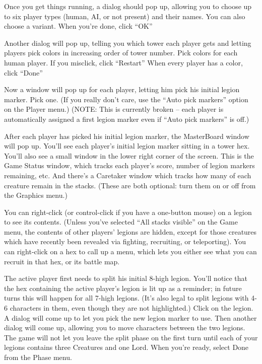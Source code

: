 \documentclass{article}
\begin{document}
Once you get things running, a dialog should pop up, allowing you to
choose up to six player types (human, AI, or not present) and their names.
You can also choose a variant.  When you're done, click ``OK'' 

Another dialog will pop up, telling you which tower each player gets and 
letting players pick colors in increasing order of tower number. Pick colors 
for each human player. If you misclick, click ``Restart'' When every player 
has a color, click ``Done''

Now a window will pop up for each player, letting him pick his initial legion
marker. Pick one. (If you really don't care, use the ``Auto pick markers''
option on the Player menu.)  (NOTE: This is currently broken -- each player
is automatically assigned a first legion marker even if ``Auto pick markers''
is off.)

After each player has picked his initial legion marker, the MasterBoard window
will pop up. You'll see each player's initial legion marker sitting in a
tower hex. You'll also see a small window in the lower right corner of the
screen. This is the Game Status window, which tracks each player's score,
number of legion markers remaining, etc. And there's a Caretaker window which 
tracks how many of each creature remain in the stacks. (These are both optional: 
turn them on or off from the Graphics menu.)

You can right-click (or control-click if you have a one-button mouse) on a 
legion to see its contents. (Unless you've selected ``All stacks visible'' on 
the Game menu, the contents of other players' legions are hidden, except for 
those creatures which have recently been revealed via fighting, recruiting, 
or teleporting). You can right-click on a hex to call up a menu, which lets 
you either see what you can recruit in that hex, or its battle map.

The active player first needs to split his initial 8-high legion. You'll
notice that the hex containing the active player's legion is lit up as a
reminder; in future turns this will happen for all 7-high legions. (It's
also legal to split legions with 4-6 characters in them, even though they
are not highlighted.) Click on the legion. A dialog will come up to let
you pick the new legion marker to use. Then another dialog will come up,
allowing you to move characters between the two legions. The game will
not let you leave the split phase on the first turn until each of your
legions contains three Creatures and one Lord. When you're ready, select
Done from the Phase menu.
\end{document}
